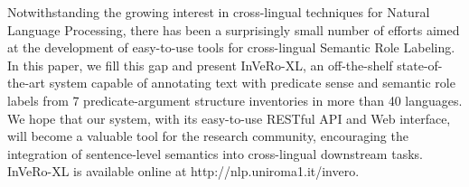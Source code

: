 Notwithstanding the growing interest in cross-lingual techniques for Natural Language Processing, there has been a surprisingly small number of efforts aimed at the development of easy-to-use tools for cross-lingual Semantic Role Labeling. In this paper, we fill this gap and present InVeRo-XL, an off-the-shelf state-of-the-art system capable of annotating text with predicate sense and semantic role labels from 7 predicate-argument structure inventories in more than 40 languages. We hope that our system, with its easy-to-use RESTful API and Web interface, will become a valuable tool for the research community, encouraging the integration of sentence-level semantics into cross-lingual downstream tasks. InVeRo-XL is available online at http://nlp.uniroma1.it/invero.
